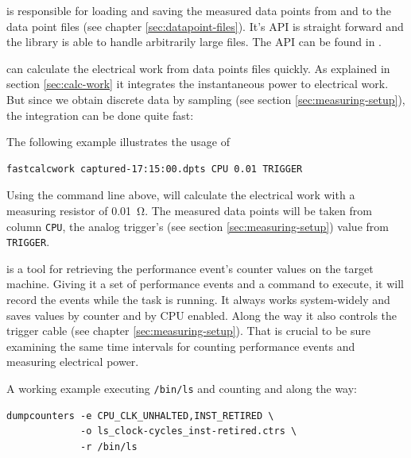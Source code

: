 \label{sec:special-developments}


\JWlfour{\JWTlibdp}

\JWTlibdp{} is responsible for loading and saving the measured data points from
and to the data point files (see chapter \ref{sec:datapoint-files}). It's API is
straight forward and the library is able to handle arbitrarily large files. The
API can be found in .


\JWlfour{\JWTfcw}

\JWTfcw{} can calculate the electrical work from data points files quickly.  As
explained in section \ref{sec:calc-work} it integrates the instantaneous power
to electrical work.  But since we obtain discrete data by sampling (see section
\ref{sec:measuring-setup}), the integration can be done quite fast:


The following example illustrates the usage of \JWTfcw{}

\begin{lstlisting}[style=Shell]
fastcalcwork captured-17:15:00.dpts CPU 0.01 TRIGGER
\end{lstlisting}

Using the command line above, \JWTfcw{} will calculate the electrical work with
a measuring resistor of \SI{0.01}{\ohm}. The measured data points will be taken
from column \texttt{CPU}, the analog trigger's (see section
\ref{sec:measuring-setup}) value from \texttt{TRIGGER}.


\JWlfour{\JWTdc}

\JWTdc{} is a tool for retrieving the performance event's counter values on
the target machine. Giving it a set of performance events and a command to
execute, it will record the events while the task is running. It always works
system-widely and saves values by counter and by CPU enabled. Along the way it
also controls the trigger cable (see chapter \ref{sec:measuring-setup}).  That
is crucial to be sure examining the same time intervals for counting performance
events and measuring electrical power.

A working example executing \texttt{/bin/ls} and counting
\JWctrCLK{} and \JWctrINST{} along the way:

\begin{lstlisting}[style=Shell]
dumpcounters -e CPU_CLK_UNHALTED,INST_RETIRED \
             -o ls_clock-cycles_inst-retired.ctrs \
             -r /bin/ls
\end{lstlisting}

